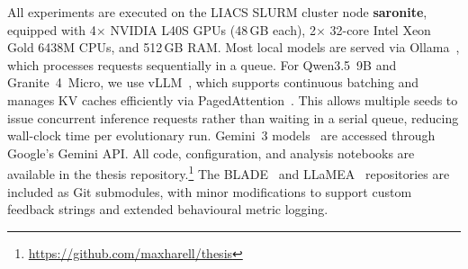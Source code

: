 All experiments are executed on the LIACS SLURM cluster node \textbf{saronite}, equipped with 4$\times$ NVIDIA L40S GPUs (48\,GB each), 2$\times$ 32-core Intel Xeon Gold 6438M CPUs, and 512\,GB RAM. Most local models are served via Ollama~\cite{ollama}, which processes requests sequentially in a queue. For Qwen3.5~9B and Granite~4~Micro, we use vLLM~\cite{kwon2023vllm}, which supports continuous batching and manages KV caches efficiently via PagedAttention~\cite{kwon2023vllm}. This allows multiple seeds to issue concurrent inference requests rather than waiting in a serial queue, reducing wall-clock time per evolutionary run. Gemini~3 models~\cite{gemini3pro, gemini3flash} are accessed through Google's Gemini API. All code, configuration, and analysis notebooks are available in the thesis repository.\footnote{\url{https://github.com/maxharell/thesis}} The BLADE~\cite{vanStein2025BLADE} and LLaMEA~\cite{vanStein2024LLaMEA} repositories are included as Git submodules, with minor modifications to support custom feedback strings and extended behavioural metric logging.
